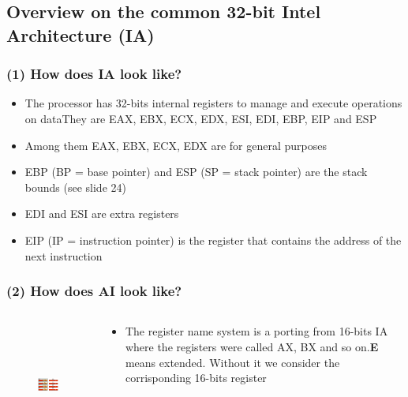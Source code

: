 \documentclass[]{beamer}
\begin{document}
	\subsection{Overview on the common 32-bit Intel Architecture (IA)}
		\begin{frame}
			\frametitle{(1) How does IA look like?}
			\begin{itemize}
				\item{The processor has 32-bits internal registers to manage and execute operations on data\newline They are EAX, EBX, ECX, EDX, ESI, EDI, EBP, EIP and ESP }
				\item{Among them EAX, EBX, ECX, EDX are for general purposes}
				\item{EBP (BP = base pointer) and ESP (SP = stack pointer) are the stack bounds (see slide 24)}
				\item{EDI and ESI are extra registers}
				\item{EIP (IP = instruction pointer) is the register that contains the address of the next instruction}
			\end{itemize}
		\end{frame}
		\begin{frame}
			\frametitle{(2) How does AI look like?}
			\begin{columns}
				\begin{column}{2.5in}
					\begin{figure}
						\includegraphics[height=1.6in]{images/registers.jpeg}
						\label{Registers Division}
					\end{figure}
				\end{column}
				\begin{column}{2.5in}
					\begin{itemize}
							\item{The register name system is a porting from 16-bits IA where the registers were called AX, BX and so on.\newline \textbf{E} means extended. Without it we consider the corrisponding 16-bits register}
					\end{itemize}
				\end{column}
			\end{columns}
		\end{frame}
\end{document}
